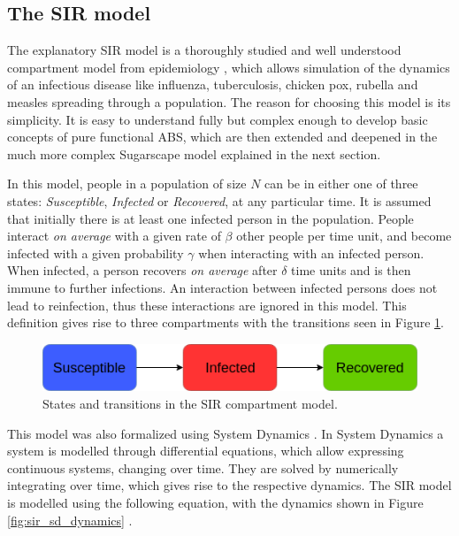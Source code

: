 \subsection{The SIR model}
\label{sec:sir_model}

The explanatory SIR model is a thoroughly studied and well understood compartment model from epidemiology \cite{kermack_contribution_1927}, which allows simulation of the dynamics of an infectious disease like influenza, tuberculosis, chicken pox, rubella and measles spreading through a population. The reason for choosing this model is its simplicity. It is easy to understand fully but complex enough to develop basic concepts of pure functional ABS, which are then extended and deepened in the much more complex Sugarscape model explained in the next section.

In this model, people in a population of size $N$ can be in either one of three states: \textit{Susceptible}, \textit{Infected} or \textit{Recovered}, at any particular time. It is assumed that initially there is at least one infected person in the population. People interact \textit{on average} with a given rate of $\beta$ other people per time unit, and become infected with a given probability $\gamma$ when interacting with an infected person. When infected, a person recovers \textit{on average} after $\delta$ time units and is then immune to further infections. An interaction between infected persons does not lead to reinfection, thus these interactions are ignored in this model. This definition gives rise to three compartments with the transitions seen in Figure \ref{fig:sir_transitions}.

\begin{figure}
	\centering
	\includegraphics[width=.7\textwidth, angle=0]{./fig/timedriven/SIR_transitions.png}
	\caption[States and transitions in the SIR compartment model]{States and transitions in the SIR compartment model.}
	\label{fig:sir_transitions}
\end{figure}

This model was also formalized using System Dynamics \cite{porter_industrial_1962}. In System Dynamics a system is modelled through differential equations, which allow expressing continuous systems, changing over time. They are solved by numerically integrating over time, which gives rise to the respective dynamics. The SIR model is modelled using the following equation, with the dynamics shown in Figure \ref{fig:sir_sd_dynamics} .


